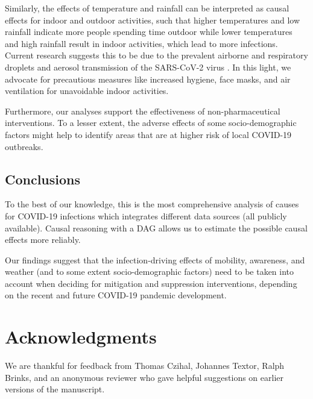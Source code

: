 \documentclass[]{elsarticle} %
\begin{document}
Similarly, the effects of temperature and rainfall can be interpreted as causal effects for indoor and outdoor activities, such that higher temperatures and low rainfall indicate more people spending time outdoor while lower temperatures and high rainfall result in indoor activities, which lead to more infections. Current research suggests this to be due to the prevalent airborne and respiratory droplets and aerosol transmission of the SARS-CoV-2 virus \citep{world2020transmission}. In this light, we advocate for precautious measures like increased hygiene, face masks, and air ventilation for unavoidable indoor activities.

Furthermore, our analyses support the effectiveness of non-pharmaceutical interventions. To a lesser extent, the adverse effects of some socio-demographic factors might help to identify areas that are at higher risk of local COVID-19 outbreaks.

\hypertarget{conclusions}{%
\subsection{Conclusions}\label{conclusions}}

To the best of our knowledge, this is the most comprehensive analysis of causes for COVID-19 infections which integrates different data sources (all publicly available). Causal reasoning with a DAG allows us to estimate the possible causal effects more reliably.

Our findings suggest that the infection-driving effects of mobility, awareness, and weather (and to some extent socio-demographic factors) need to be taken into account when deciding for mitigation and suppression interventions, depending on the recent and future COVID-19 pandemic development.

\hypertarget{acknowledgments}{%
\section*{Acknowledgments}\label{acknowledgments}}

We are thankful for feedback from Thomas Czihal, Johannes Textor, Ralph Brinks, and an anonymous reviewer who gave helpful suggestions on earlier versions of the manuscript.

\renewcommand\refname{References}

\end{document}
